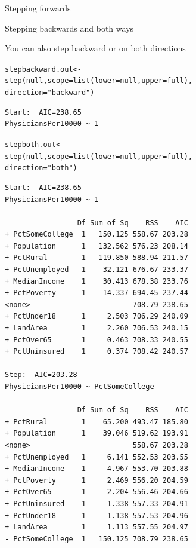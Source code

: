 \documentclass{beamer}\usepackage[]{graphicx}\usepackage[]{color}
\makeatletter
\newcommand{\hlstr}[1]{\textcolor[rgb]{1,0.894,0.71}{#1}}%
\newcommand{\hlstd}[1]{\textcolor[rgb]{1,0.894,0.769}{#1}}%
\newcommand{\hlkwb}[1]{\textcolor[rgb]{0.804,0.776,0.451}{#1}}%
\newcommand{\hlkwc}[1]{\textcolor[rgb]{0.78,0.941,0.545}{#1}}%
\newcommand{\hlkwd}[1]{\textcolor[rgb]{1,0.78,0.769}{#1}}%
\newenvironment{kframe}{%
 \def\at@end@of@kframe{}%
 \ifinner\ifhmode%
  \def\at@end@of@kframe{\end{minipage}}%
  \begin{minipage}{\columnwidth}%
 \fi\fi%
 \def\FrameCommand##1{\hskip\@totalleftmargin \hskip-\fboxsep
 \colorbox{shadecolor}{##1}\hskip-\fboxsep
     \hskip-\linewidth \hskip-\@totalleftmargin \hskip\columnwidth}%
 \MakeFramed {\advance\hsize-\width
   \@totalleftmargin\z@ \linewidth\hsize
   \@setminipage}}%
 {\par\unskip\endMakeFramed%
 \at@end@of@kframe}
\newenvironment{knitrout}{}{} %
\makeatother
\begin{document}
\begin{darkframes}
\begin{frame}[fragile]{Stepping forwards}
      \lc 
    \end{frame}

  
    \begin{frame}[fragile]{Stepping backwards and both ways}

    You can also step backward or on both directions

\begin{knitrout}
\begin{kframe}
\begin{alltt}
\hlstd{stepbackward.out} \hlkwb{<-}
    \hlkwd{step}\hlstd{(null,} \hlkwc{scope}\hlstd{=}\hlkwd{list}\hlstd{(}\hlkwc{lower}\hlstd{=null,} \hlkwc{upper}\hlstd{=full),}
         \hlkwc{direction} \hlstd{=}\hlstr{"backward"}\hlstd{)}
\end{alltt}
\begin{verbatim}
Start:  AIC=238.65
PhysiciansPer10000 ~ 1
\end{verbatim}
\begin{alltt}
\hlstd{stepboth.out} \hlkwb{<-}
    \hlkwd{step}\hlstd{(null,} \hlkwc{scope}\hlstd{=}\hlkwd{list}\hlstd{(}\hlkwc{lower}\hlstd{=null,} \hlkwc{upper}\hlstd{=full),}
         \hlkwc{direction} \hlstd{=}\hlstr{"both"}\hlstd{)}
\end{alltt}
\begin{verbatim}
Start:  AIC=238.65
PhysiciansPer10000 ~ 1

                 Df Sum of Sq    RSS    AIC
+ PctSomeCollege  1   150.125 558.67 203.28
+ Population      1   132.562 576.23 208.14
+ PctRural        1   119.850 588.94 211.57
+ PctUnemployed   1    32.121 676.67 233.37
+ MedianIncome    1    30.413 678.38 233.76
+ PctPoverty      1    14.337 694.45 237.44
<none>                        708.79 238.65
+ PctUnder18      1     2.503 706.29 240.09
+ LandArea        1     2.260 706.53 240.15
+ PctOver65       1     0.463 708.33 240.55
+ PctUninsured    1     0.374 708.42 240.57

Step:  AIC=203.28
PhysiciansPer10000 ~ PctSomeCollege

                 Df Sum of Sq    RSS    AIC
+ PctRural        1    65.200 493.47 185.80
+ Population      1    39.046 519.62 193.91
<none>                        558.67 203.28
+ PctUnemployed   1     6.141 552.53 203.55
+ MedianIncome    1     4.967 553.70 203.88
+ PctPoverty      1     2.469 556.20 204.59
+ PctOver65       1     2.204 556.46 204.66
+ PctUninsured    1     1.338 557.33 204.91
+ PctUnder18      1     1.138 557.53 204.96
+ LandArea        1     1.113 557.55 204.97
- PctSomeCollege  1   150.125 708.79 238.65


\end{verbatim}
\end{kframe}
\end{knitrout}
\end{frame}
\end{darkframes}
\end{document}
